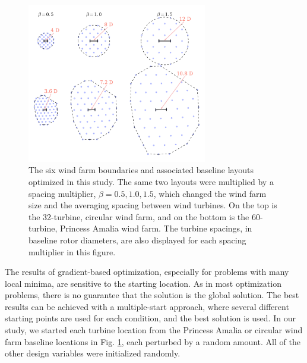 \begin{figure}[htbp]
  \centering
  \includegraphics[width=0.7\textwidth]{Figures/spacing_multipliers.pdf}
  \caption{\label{farm_spacings}The six wind farm boundaries and associated baseline layouts optimized in this study. The same two layouts were multiplied by a spacing multiplier, $\beta=0.5,1.0,1.5$, which changed the wind farm size and the averaging spacing between wind turbines.  On the top is the 32-turbine, circular wind farm, and on the bottom is the 60-turbine, Princess Amalia wind farm. The turbine spacings, in baseline rotor diameters, are also displayed for each spacing multiplier in this figure.}
\end{figure}

The results of gradient-based optimization, especially for problems with many local minima, are sensitive to the starting location. As in most optimization problems, there is no guarantee that the solution is the global solution. The best results can be achieved with a multiple-start approach, where several different starting points are used for each condition, and the best solution is used. In our study, we started each turbine location from the Princess Amalia or circular wind farm baseline locations in Fig. \ref{farm_spacings}, each perturbed by a random amount. All of the other design variables were initialized randomly.




